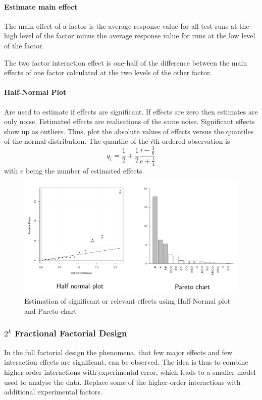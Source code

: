 \documentclass[11pt]{article}
\theoremstyle{definition}
\begin{document}
\paragraph{Estimate main effect} The main effect of a factor is the average response value for all test runs at the high level of the factor minus the average response value for runs at the low level of the factor.

The two factor interaction effect is one-half of the difference between the main effects of one factor calculated at the two levels of the other factor.

\paragraph{Half-Normal Plot} Are used to estimate if effects are significant. If effects are zero then estimates are only noise. Estimated effects are realisations of the same noise. Significant effects show up as outliers. Thus, plot the absolute values of effects versus the quantiles of the normal distribution. The quantile of the $i$th ordered observation is
\begin{equation*}
	q_i = \frac{1}{2}+\frac{1}{2}\frac{i-\frac{3}{8}}{e+\frac{1}{4}}
\end{equation*}
with $e$ being the number of estimated effects.
\begin{figure}[H]
	\centering
	\includegraphics[width=0.8\linewidth]{img/significant_relevant_effects_factorial_design}
	\caption{Estimation of significant or relevant effects using Half-Normal plot and Pareto chart}
	\label{fig:significantrelevanteffectsfactorialdesign}
\end{figure}

\subsubsection{$2^k$ Fractional Factorial Design}
In the full factorial design the phenomena, that few major effects and few interaction effects are significant, can be observed. The idea is thus to combine higher order interactions with experimental error, which leads to a smaller model used to analyse the data. Replace some of the higher-order interactions with additional experimental factors.
\end{document}
